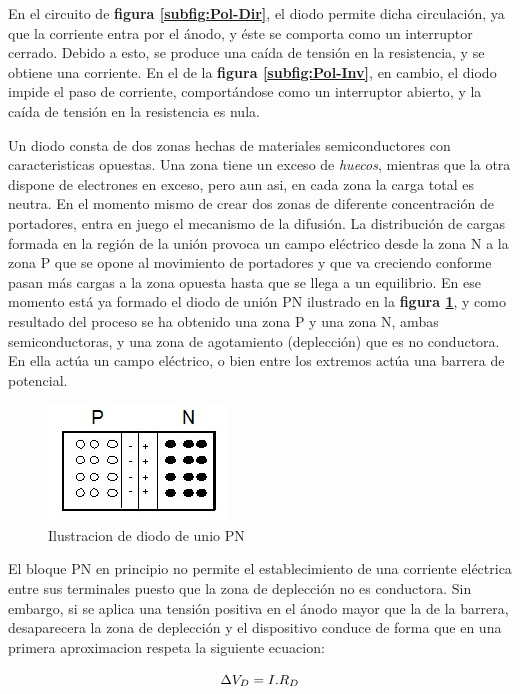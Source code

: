 \documentclass[11pt,a4paper]{article}
\begin{document}
En el circuito de \textbf{figura \ref{subfig:Pol-Dir}}, el diodo permite dicha circulación, ya que la corriente entra por el ánodo, y éste se comporta como un interruptor cerrado. Debido a esto, se produce una caída de tensión en la resistencia, y se obtiene una corriente. En el de la \textbf{figura \ref{subfig:Pol-Inv}}, en cambio, el diodo impide el paso de corriente, comportándose como un interruptor abierto, y la caída de tensión en la resistencia es nula.

Un diodo consta de dos zonas hechas de materiales semiconductores con caracteristicas opuestas. Una zona tiene un exceso de \textit{huecos}, mientras que la otra dispone de electrones en exceso, pero aun asi, en cada zona la carga total es neutra. En el momento mismo de crear dos zonas de diferente concentración de portadores, entra en juego el mecanismo de la difusión. La distribución de cargas formada en la región de la unión provoca un campo eléctrico desde la zona N a la zona P que se opone al movimiento de portadores y que va creciendo conforme pasan más cargas a la zona opuesta hasta que se llega a un equilibrio. En ese momento está ya formado el diodo de unión PN ilustrado en la \textbf{figura \ref{fig:Dif}}, y como resultado del proceso se ha obtenido una zona P y una zona N, ambas semiconductoras, y una zona de agotamiento (deplección) que es no conductora. En ella actúa un campo eléctrico, o bien entre los extremos actúa una barrera de potencial.

\begin{figure}[h]
\centering
\includegraphics[scale=0.8]{Difusion}
   \caption{Ilustracion de diodo de unio PN}
   \label{fig:Dif}
\end{figure}

El bloque PN  en principio no permite el establecimiento de una corriente eléctrica entre sus terminales puesto que la zona de deplección no es conductora. Sin embargo, si se aplica una tensión positiva en el ánodo mayor que la de la barrera, desaparecera la zona de deplección y el dispositivo conduce de forma que en una primera aproximacion respeta la siguiente ecuacion:

\begin{equation}{\label{Aprox}}
\Delta  V_D = I.R_D\\
\end{equation}
\end{document}
